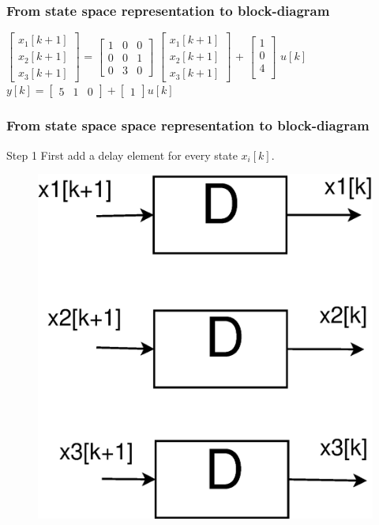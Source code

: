 \begin{frame}
	\frametitle{From state space representation to block-diagram }
		\begin{example}
				\begin{center}
					$\begin{bmatrix}
						x_1[k+1]\\
						x_2[k+1]\\
						x_3[k+1]
					\end{bmatrix}$
					= 
					$\begin{bmatrix}
						1 & 0 & 0 \\
						0 & 0 & 1 \\
						0 & 3 & 0
					\end{bmatrix}$ 
					$\begin{bmatrix}
						x_1[k+1]\\
						x_2[k+1]\\
						x_3[k+1]
					\end{bmatrix}$
					 +
					$\begin{bmatrix}
					1\\
					0\\
					4\\
					\end{bmatrix}$ $u[k]$\\
					
					$y[k] = 
					\begin{bmatrix}
					5 & 1 & 0
					\end{bmatrix}
					+ 
					\begin{bmatrix}
					1
					\end{bmatrix}
					u[k]$ \\
				\end{center}
		\end{example} 
		
	
\end{frame}
\begin{frame}
	\frametitle{From state space space representation to block-diagram}
	\begin{block}{Step 1}
		First add a delay element for every state $x_i[k]$.
		\begin{figure}
			\centering
			\includegraphics[width=0.35\linewidth]{Images/Discrete_time_eps_11.eps}
		\end{figure}
	\end{block}
\end{frame}
